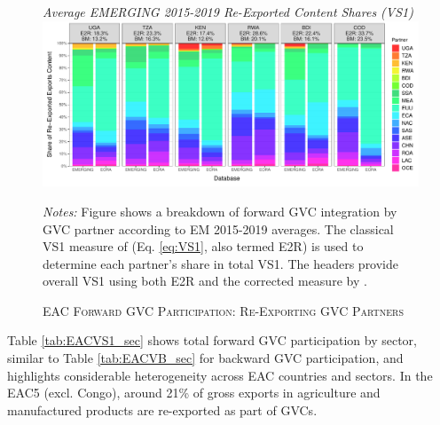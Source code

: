 \documentclass[a4paper]{article}
\begin{document}
\begin{figure}[h!]
\centering
\caption{\label{fig:EACVS1_ctry}\textsc{EAC Forward GVC Participation: Re-Exporting GVC Partners}}
\small{\textit{Average EMERGING 2015-2019 Re-Exported Content Shares (VS1)}}
\vspace{2mm}
\includegraphics[width=1\textwidth]{"Figures/VS1_shares_ctry.pdf"} \\ \raggedright
\scriptsize
\vspace{-3mm}
\emph{Notes:} Figure shows a breakdown of forward GVC integration by GVC partner according to EM 2015-2019 averages. The classical VS1 measure of \citet{daudin2011produces} (Eq. \ref{eq:VS1}, also termed E2R) is used to determine each partner's share in total VS1. The headers provide overall VS1 using both E2R and the corrected measure by \citet{borin2019measuring}. 
\end{figure}

Table \ref{tab:EACVS1_sec} shows total forward GVC participation by sector, similar to Table \ref{tab:EACVB_sec} for backward GVC participation, and highlights considerable heterogeneity across EAC countries and sectors. In the EAC5 (excl. Congo), around 21\% of gross exports in agriculture and manufactured products are re-exported as part of GVCs. \newline
\end{document}
